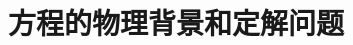 \newcommand\tbbint{{-\mkern -16mu\int}}
\newcommand\dbbint{{-\mkern -19mu\int}}
\newcommand\intbar{{\mathchoice{\dbbint}{\tbbint}{\tbbint}{\tbbint}}}
\newcommand{\>}{\hspace{0.0833em}}
\renewcommand\thesection{4.\arabic{section}}
\theoremstyle{remark}
\newtheorem*{remark*}{注}


\section{方程的物理背景和定解问题}
